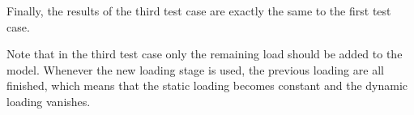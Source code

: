 Finally, the results of the third test case are exactly the same to the first test case.

Note that in the third test case only the remaining load should be added to the model. 
Whenever the new loading stage is used, the previous loading are all finished,
which means that the static loading becomes constant and the dynamic loading vanishes.





